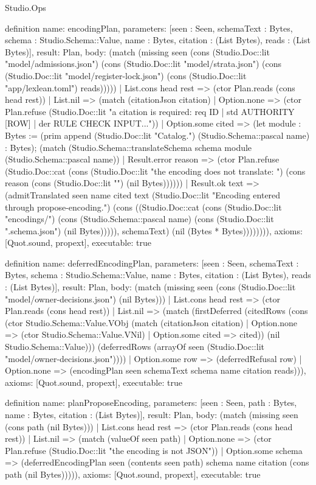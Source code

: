 \begin{lexlean}{Studio.Ops}
\begin{semanticmodule}
definition{
  name: encodingPlan,
  parameters: [seen : Seen, schemaText : Bytes, schema : Studio.Schema::Value, name : Bytes, citation : (List Bytes), reads : (List Bytes)],
  result: Plan,
  body: (match (missing seen (cons (Studio.Doc::lit "model/admissions.json") (cons (Studio.Doc::lit "model/strata.json") (cons (Studio.Doc::lit "model/register-lock.json") (cons (Studio.Doc::lit "app/lexlean.toml") reads)))))
    | List.cons head rest => (ctor Plan.reads (cons head rest))
    | List.nil => (match (citationJson citation)
      | Option.none => (ctor Plan.refuse (Studio.Doc::lit "a citation is required: req ID | std AUTHORITY [ROW] | der RULE CHECK INPUT...\n"))
      | Option.some cited => (let module : Bytes := (prim append (Studio.Doc::lit "Catalog.") (Studio.Schema::pascal name) : Bytes); (match (Studio.Schema::translateSchema schema module (Studio.Schema::pascal name))
          | Result.error reason => (ctor Plan.refuse (Studio.Doc::cat (cons (Studio.Doc::lit "the encoding does not translate: ") (cons reason (cons (Studio.Doc::lit "\n") (nil Bytes))))))
          | Result.ok text => (admitTranslated seen name cited text (Studio.Doc::lit "Encoding entered through propose-encoding.") (cons ((Studio.Doc::cat (cons (Studio.Doc::lit "encodings/") (cons (Studio.Schema::pascal name) (cons (Studio.Doc::lit ".schema.json") (nil Bytes))))), schemaText) (nil (Bytes * Bytes)))))))),
  axioms: [Quot.sound, propext],
  executable: true
}

definition{
  name: deferredEncodingPlan,
  parameters: [seen : Seen, schemaText : Bytes, schema : Studio.Schema::Value, name : Bytes, citation : (List Bytes), reads : (List Bytes)],
  result: Plan,
  body: (match (missing seen (cons (Studio.Doc::lit "model/owner-decisions.json") (nil Bytes)))
    | List.cons head rest => (ctor Plan.reads (cons head rest))
    | List.nil => (match (firstDeferred (citedRows (cons (ctor Studio.Schema::Value.VObj (match (citationJson citation)
      | Option.none => (ctor Studio.Schema::Value.VNil)
      | Option.some cited => cited)) (nil Studio.Schema::Value))) (deferredRows (arrayOf seen (Studio.Doc::lit "model/owner-decisions.json"))))
      | Option.some row => (deferredRefusal row)
      | Option.none => (encodingPlan seen schemaText schema name citation reads))),
  axioms: [Quot.sound, propext],
  executable: true
}


definition{
  name: planProposeEncoding,
  parameters: [seen : Seen, path : Bytes, name : Bytes, citation : (List Bytes)],
  result: Plan,
  body: (match (missing seen (cons path (nil Bytes)))
    | List.cons head rest => (ctor Plan.reads (cons head rest))
    | List.nil => (match (valueOf seen path)
      | Option.none => (ctor Plan.refuse (Studio.Doc::lit "the encoding is not JSON\n"))
      | Option.some schema => (deferredEncodingPlan seen (contents seen path) schema name citation (cons path (nil Bytes))))),
  axioms: [Quot.sound, propext],
  executable: true
}


\end{semanticmodule}
\end{lexlean}
